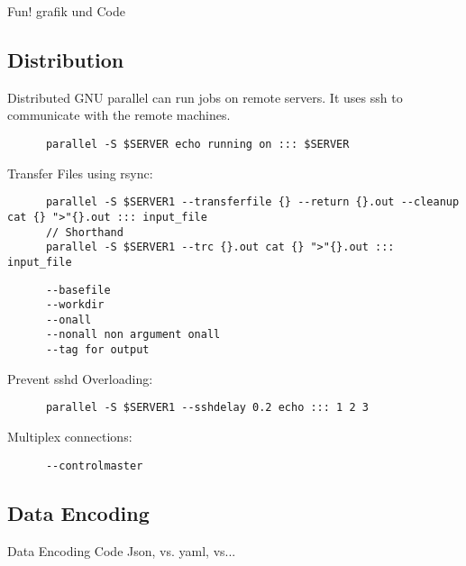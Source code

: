 \begin{frame}{Fun!}
   grafik und Code
\end{frame}

\subsection{Distribution}
\begin{frame}[fragile]{Distributed}
   GNU parallel can run jobs on remote servers. It uses ssh to communicate with the remote machines.\\
   \begin{verbatim}
      parallel -S $SERVER echo running on ::: $SERVER
   \end{verbatim}
   Transfer Files using rsync:
   \begin{verbatim}
      parallel -S $SERVER1 --transferfile {} --return {}.out --cleanup cat {} ">"{}.out ::: input_file
      // Shorthand
      parallel -S $SERVER1 --trc {}.out cat {} ">"{}.out ::: input_file
   \end{verbatim}
   \begin{verbatim}
      --basefile
      --workdir
      --onall
      --nonall non argument onall
      --tag for output
   \end{verbatim}
   Prevent sshd Overloading:
   \begin{verbatim}
      parallel -S $SERVER1 --sshdelay 0.2 echo ::: 1 2 3
   \end{verbatim}
   Multiplex connections:
   \begin{verbatim}
      --controlmaster
   \end{verbatim}


\end{frame}
\subsection{Data Encoding}
\begin{frame}{Data Encoding}
      Code Json, vs. yaml, vs...
\end{frame}
